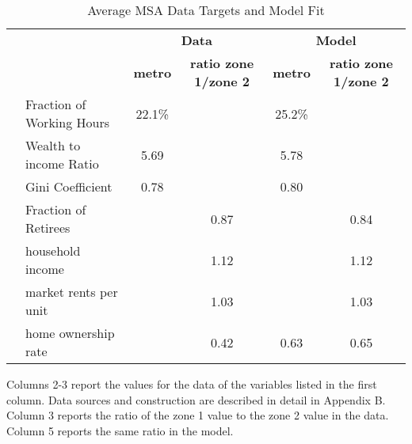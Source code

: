 \documentclass[letterpaper,12pt,dvipsnames,usenames]{article}
\theoremstyle{definition}
\begin{document}
\begin{table}[htbp]
  \caption{Average MSA Data Targets and Model Fit}
\setlength{\tabcolsep}{5pt}
\renewcommand{\arraystretch}{1.10}
\begin{center}
{\scriptsize
     \begin{tabular}{ll|cc|cc}
    \hline
    &     & \multicolumn{2}{c|}{\textbf{Data}} & \multicolumn{2}{c}{\textbf{ Model}} \\
    &     & \multicolumn{1}{c}{\textbf{metro}} & \multicolumn{1}{c|}{\textbf{ratio zone 1/zone 2}} & \multicolumn{1}{c}{\textbf{metro}} &  \multicolumn{1}{c}{\textbf{ratio zone 1/zone 2}} \\     \hline
&Fraction of Working Hours  &22.1\% & &25.2\% & \\
&Wealth to income Ratio &5.69 & &5.78 & \\
&Gini Coefficient & 0.78 & &0.80 & \\
&Fraction of Retirees & &0.87 & &0.84 \\
&household income & &1.12 & &1.12\\
&market rents per unit & &1.03 & &1.03\\
&home ownership rate & &0.42 &0.63 &0.65\\

 \hline
        \end{tabular}
}
\end{center}
\begin{minipage}{\textwidth}\scriptsize
     Columns 2-3 report the values for the data of the variables listed in the first column. Data sources and construction are described in detail in Appendix B. Column 3 reports the ratio of the zone 1 value to the zone 2 value in the data. Column 5 reports the same ratio in the model.
   \end{minipage}
  \label{tab:NYCtargets}%
\end{table}%
\end{document}
